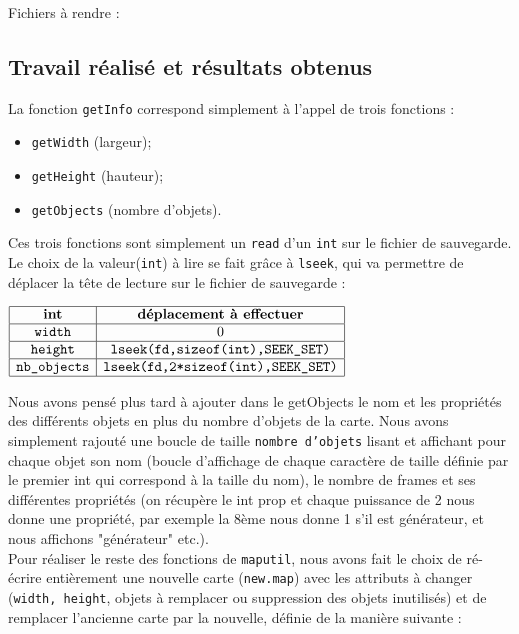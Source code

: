 \documentclass[a4paper, 12pt]{article}
\begin{document}
	Fichiers à rendre :
	
	\subsection{Travail réalisé et résultats obtenus}
	
	La fonction \texttt{getInfo} correspond simplement à l'appel de trois fonctions :
	\begin{itemize}
		\item \texttt{getWidth} (largeur);
		\item \texttt{getHeight} (hauteur);
		\item \texttt{getObjects} (nombre d'objets).
	\end{itemize}
	Ces trois fonctions sont simplement un \texttt{read} d'un \texttt{int} sur le fichier de sauvegarde. Le choix de la valeur(\texttt{int}) à lire se fait grâce à \texttt{lseek}, qui va permettre de déplacer la tête de lecture sur le fichier de sauvegarde : 
	
\begin{center} 

	$
	\begin{array}{|c|c|}
 	\hline \textbf{int} & \textbf{déplacement à effectuer} \\ 
 	\hline \texttt{width} & 0 \\ 
 	\hline \texttt{height} & \texttt{lseek(fd,sizeof(int),SEEK\_SET)} \\ 
 	\hline \texttt{nb\_objects} & \texttt{lseek(fd,2*sizeof(int),SEEK\_SET)} \\ 
 	\hline \end{array}
 	$ 

\end{center}
Nous avons pensé plus tard à ajouter dans le getObjects le nom et les propriétés des différents objets en plus du nombre d'objets de la carte. Nous avons simplement rajouté une boucle de taille \texttt{nombre d'objets} lisant et affichant pour chaque objet son nom (boucle d'affichage de chaque caractère de taille définie par le premier int qui correspond à la taille du nom), le nombre de frames et ses différentes propriétés (on récupère le int prop et chaque puissance de 2 nous donne une propriété, par exemple la 8ème nous donne 1 s'il est générateur, et nous affichons "générateur" etc.).\\
Pour réaliser le reste des fonctions de \texttt{maputil}, nous avons fait le choix de ré-écrire entièrement une nouvelle carte (\texttt{new.map}) avec les attributs à changer (\texttt{width, height}, objets à remplacer ou suppression des objets inutilisés) et de remplacer l'ancienne carte par la nouvelle, définie de la manière suivante : 
\end{document}
